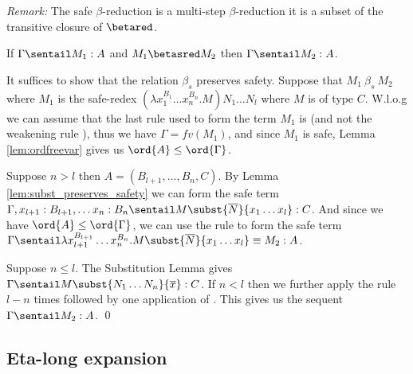 \noindent \emph{Remark:} The safe $\beta$-reduction is a multi-step
$\beta$-reduction \ie it is a subset of the transitive closure of
$\betared$.


\begin{lemma}
\label{lem:safered_preserve_safety}
If $\Gamma \sentail M_1 :A$ and $M_1\betasred M_2$ then $\Gamma \sentail M_2 :A$.
\end{lemma}

\proof
  It suffices to show that the relation $\beta_s$ preserves safety.
Suppose that $M_1\ \beta_s\ M_2$ where $M_1$ is the
safe-redex $(\lambda x_1^{B_1} \ldots x_n^{B_n} . M) N_1
  \ldots N_l $ where $M$ is of type $C$.  W.l.o.g we can assume that the last rule used
to form the term $M_1$ is  (and not the weakening rule
), thus  we have $\Gamma = fv(M_1)$, and since $M_1$ is
safe, Lemma \ref{lem:ordfreevar} gives us $\ord{A} \leq
\ord{\Gamma}$.

Suppose $n>l$ then $A = (B_{l+1}, \ldots, B_n, C)$. By Lemma
\ref{lem:subst_preserves_safety} we can form the safe term $\Gamma,
x_{l+1}:B_{l+1}, \ldots x_n :B_{n}\sentail M\subst{\overline{N}}{x_1
\ldots x_l} : C$. And since we have $\ord{A} \leq \ord{\Gamma}$, we
can use the  rule to form the safe term $\Gamma
\sentail \lambda x_{l+1}^{B_{l+1}} \ldots x_n^{B_n} . M\subst{\overline{N}}{x_1
\ldots x_l} \equiv M_2 : A$.

Suppose $n \leq l$. The Substitution Lemma gives $\Gamma \sentail
M\subst{N_1 \ldots N_n}{\overline{x}} : C$. If $n<l$ then we further apply the rule  $l-n$ times followed by one application of
. This gives us the sequent $\Gamma \sentail M_2 :A$.
  \qed

\subsection*{Eta-long expansion}

